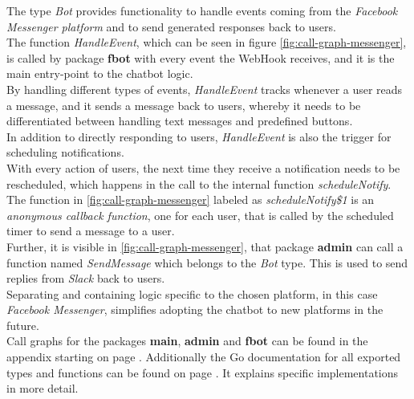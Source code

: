 The type \emph{Bot} provides functionality to handle events coming from the \emph{Facebook Messenger platform}
and to send generated responses back to users.
\\
The function \emph{HandleEvent}, which can be seen in figure \ref{fig:call-graph-messenger},
is called by package \textbf{fbot} with every event the WebHook receives,
and it is the main entry-point to the chatbot logic.
\\
By handling different types of events,
\emph{HandleEvent} tracks whenever a user reads a message,
and it sends a message back to users,
whereby it needs to be differentiated between handling text messages
and predefined buttons.
\\

In addition to directly responding to users,
\emph{HandleEvent} is also the trigger for scheduling notifications.
\\
With every action of users, the next time they receive a notification needs to be rescheduled,
which happens in the call to the internal function \emph{scheduleNotify}.
The function in \ref{fig:call-graph-messenger} labeled as \emph{scheduleNotify\$1} is an \emph{anonymous callback function},
one for each user, that is called by the scheduled timer to send a message to a user.
\\

Further, it is visible in \ref{fig:call-graph-messenger},
that package \textbf{admin} can call a function named \emph{SendMessage} which belongs to the \emph{Bot} type.
This is used to send replies from \emph{Slack} back to users.
\\

Separating and containing logic specific to the chosen platform, in this case \emph{Facebook Messenger},
simplifies adopting the chatbot to new platforms in the future.
\\

Call graphs for the packages \textbf{main}, \textbf{admin} and \textbf{fbot} can be found in the appendix starting on page \pageref{a:call-graph}.
Additionally the Go documentation for all exported types and functions can be found on page \pageref{a:docs}.
It explains specific implementations in more detail.
\\


